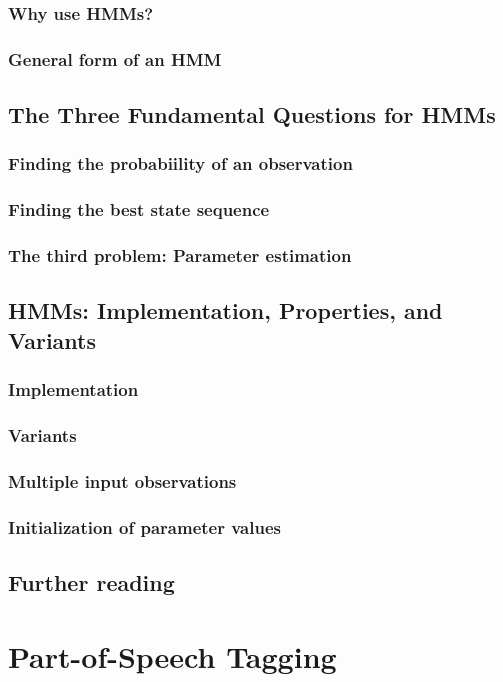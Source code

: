 \documentclass[a4paper]{article}
\begin{document}
\subsubsection{Why use HMMs?}
\subsubsection{General form of an HMM}
\subsection{The Three Fundamental Questions for HMMs}
\subsubsection{Finding the probabiility of an observation}
\subsubsection{Finding the best state sequence}
\subsubsection{The third problem: Parameter estimation}
\subsection{HMMs: Implementation, Properties, and Variants}
\subsubsection{Implementation}
\subsubsection{Variants}
\subsubsection{Multiple input observations}
\subsubsection{Initialization of parameter values}
\subsection{Further reading}
\newpage
\section{Part-of-Speech Tagging}
\end{document}
